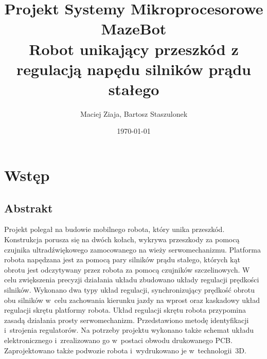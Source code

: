 \documentclass{article}
\author{Maciej Ziaja, Bartosz Staszulonek}
\date{\today}
\begin{document}
\title{
  Projekt Systemy Mikroprocesorowe \\
  \large MazeBot \\
    Robot unikający przeszkód z regulacją napędu silników prądu stałego}

\maketitle
\tableofcontents
\newpage

\section{Wstęp}

\subsection{Abstrakt}
Projekt polegał na budowie mobilnego robota, który unika przeszkód.
Konstrukcja porusza się na dwóch kołach, wykrywa przeszkody za pomocą czujnika ultradźwiękowego zamocowanego na wieży serwomechanizmu.
Platforma robota napędzana jest za pomocą pary silników prądu stałego, których kąt obrotu jest odczytywany przez robota za pomocą czujników szczelinowych.
W celu zwiększenia precyzji działania układu zbudowano układy regulacji prędkości silników.
Wykonano dwa typy układ regulacji, synchronizujący prędkość obrotu obu silników w~celu zachowania kierunku jazdy na wprost oraz kaskadowy układ regulacji skrętu platformy robota.
Układ regulacji skrętu robota przypomina zasadą działania prosty serwomechanizm.
Przedstawiono metodę identyfikacji i~strojenia regulatorów.
Na potrzeby projektu wykonano także schemat układu elektronicznego i~zrealizowano go w~postaci obwodu drukowanego PCB.
Zaprojektowano także podwozie robota i~wydrukowano je w~technologii~3D.
\end{document}
